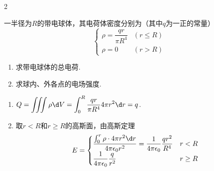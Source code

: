\begin{multicols}{2}
\begin{problem} %
    一半径为$R$的带电球体，其电荷体密度分别为（其中$q$为一正的常量）
    \[\begin{cases}
        \rho=\dfrac{qr}{\pi R^4}&(r\leq R)\\
        \rho=0&(r>R)
    \end{cases}\]
    \begin{enumerate}
        \item 求带电球体的总电荷.
        \item 求球内、外各点的电场强度.
    \end{enumerate}
\end{problem}
\begin{solution}\leavevmode
    \begin{enumerate}
        \item $Q=\displaystyle\iiint{\rho\d V}=\int_0^R{\frac{qr}{\pi R^4}4\pi r^2\d r}=q$.
        \item 取$r<R$和$r\ge R$的高斯面，由高斯定理
        \[E=\begin{cases}
            \displaystyle\frac{\int_0^r{\rho\cdot4\pi r^2\d r}}{4\pi\epsilon_0r^2}=\frac{1}{4\pi\epsilon_0}\frac{qr^2}{R^4} & r<R\\
            \displaystyle\frac{1}{4\pi\epsilon_0}\frac{q}{r^2} & r\geq R
        \end{cases}\]
    \end{enumerate}
\end{solution}
\end{multicols}